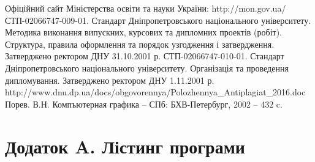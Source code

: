 \documentclass[14pt,a4paper]{extarticle}
\theoremstyle{definition}
\begin{document}
\begin{thebibliography}{9}
\bibitem{} Офіційний сайт Міністерства освіти та науки України: http://mon.gov.ua/
\bibitem{} СТП-02066747-009-01. Стандарт Дніпропетровського національного університету. Методика виконання випускних, курсових та дипломних проектів (робіт). Структура, правила оформлення та порядок узгодження і затвердження. Затверджено ректором ДНУ 31.10.2001 р.
\bibitem{} СТП-02066747-010-01. Стандарт Дніпропетровського національного університету. Організація та проведення дипломування. Затверджено ректором ДНУ 1.11.2001 р.
\bibitem{} http://www.dnu.dp.ua/docs/obgovorennya/Polozhennya\_Antiplagiat\_2016.doc
 Порев. В.Н. Компъютерная графика -- СПб: БХВ-Петербург, 2002 -- 432 c.
\end{thebibliography}

\section*{Додаток A. Лістинг програми}
\tiny
\end{document}

